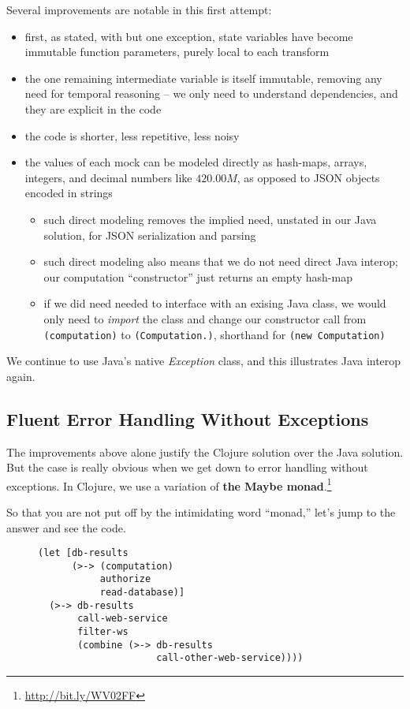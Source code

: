 \documentclass[11pt]{article}
\begin{document}
Several improvements are notable in this first attempt:
\begin{itemize}
\item first, as stated, with but one exception, state variables have
become immutable function parameters, purely local to each
transform
\item the one remaining intermediate variable is itself immutable,
removing any need for temporal reasoning -- we only need to
understand dependencies, and they are explicit in the code
\item the code is shorter, less repetitive, less noisy
\item the values of each mock can be modeled directly as hash-maps,
arrays, integers, and decimal numbers like $420.00M$, as opposed
to JSON objects encoded in strings
\begin{itemize}
\item such direct modeling removes the implied need, unstated in our
Java solution, for JSON serialization and parsing
\item such direct modeling also means that we do not need direct Java
interop; our computation ``constructor'' just returns an empty
hash-map
\item if we did need needed to interface with an exising Java class,
we would only need to \emph{import} the class and change our
constructor call from \verb|(computation)| to
\verb|(Computation.)|, shorthand for 
\verb|(new Computation)|
\end{itemize}
\end{itemize}

We continue to use Java's native \emph{Exception} class, and this
illustrates Java interop again.
\subsection{Fluent Error Handling Without Exceptions}
\label{sec-3-2}

The improvements above alone justify the Clojure solution over the
Java solution. But the case is really obvious when we get down to
error handling without exceptions. In Clojure, we use a variation
of \textbf{the Maybe monad}.\footnote{\url{http://bit.ly/WV02FF}}

So that you are not put off by the intimidating word ``monad,''
let's jump to the answer and see the code.

\begin{figure}[H]
\label{monadic-main}
\begin{verbatim}
(let [db-results
      (>-> (computation)
           authorize
           read-database)]
  (>-> db-results
       call-web-service
       filter-ws
       (combine (>-> db-results
                     call-other-web-service))))
\end{verbatim}
\end{figure}
\end{document}
